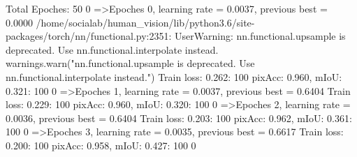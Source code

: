Total Epoches: 50
  0%
=>Epoches 0, learning rate = 0.0037,                 previous best = 0.0000
/home/socialab/human_vision/lib/python3.6/site-packages/torch/nn/functional.py:2351: UserWarning: nn.functional.upsample is deprecated. Use nn.functional.interpolate instead.
  warnings.warn("nn.functional.upsample is deprecated. Use nn.functional.interpolate instead.")
Train loss: 0.262: 100%
pixAcc: 0.960, mIoU: 0.321: 100%
  0%
=>Epoches 1, learning rate = 0.0037,                 previous best = 0.6404
Train loss: 0.229: 100%
pixAcc: 0.960, mIoU: 0.320: 100%
  0%
=>Epoches 2, learning rate = 0.0036,                 previous best = 0.6404
Train loss: 0.203: 100%
pixAcc: 0.962, mIoU: 0.361: 100%
  0%
=>Epoches 3, learning rate = 0.0035,                 previous best = 0.6617
Train loss: 0.200: 100%
pixAcc: 0.958, mIoU: 0.427: 100%
  0%
